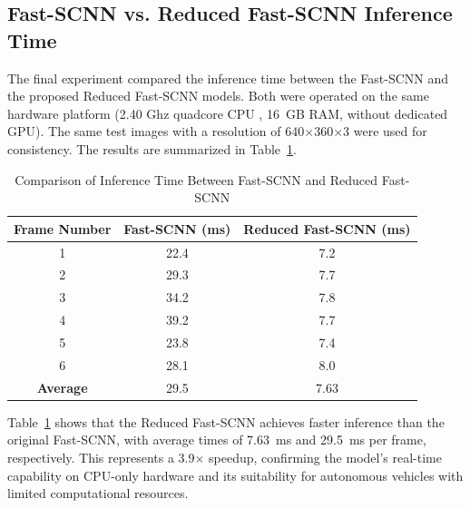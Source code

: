 \documentclass[conference, a4paper]{IEEEtran}[2015/08/26]
\begin{document}
\subsection{Fast-SCNN vs. Reduced Fast-SCNN Inference Time}
The final experiment compared the inference time between the Fast-SCNN and the proposed Reduced Fast-SCNN models. Both were operated on the same hardware platform (2.40 Ghz quadcore CPU , 16~GB RAM, without dedicated GPU). The same test images with a resolution of 640$\times$360$\times$3 were used for consistency. The results are summarized in Table~\ref{tab:lane_detection_inference_time}.

\begin{table}[H]
	\centering
	\caption{Comparison of Inference Time Between Fast-SCNN and Reduced Fast-SCNN}
	\label{tab:lane_detection_inference_time}
	\begin{tabular}{|c|c|c|}
		\hline
		\textbf{Frame Number} & \textbf{Fast-SCNN (ms)} & \textbf{Reduced Fast-SCNN (ms)} \\ \hline
		1 & 22.4 & 7.2 \\ \hline
		2 & 29.3 & 7.7 \\ \hline
		3 & 34.2 & 7.8 \\ \hline
		4 & 39.2 & 7.7 \\ \hline
		5 & 23.8 & 7.4 \\ \hline
		6 & 28.1 & 8.0 \\ \hline
		\textbf{Average} & 29.5 & 7.63 \\ \hline
	\end{tabular}
\end{table}


Table~\ref{tab:lane_detection_inference_time} shows that the Reduced Fast-SCNN achieves faster inference than the original Fast-SCNN, with average times of 7.63~ms and 29.5~ms per frame, respectively. This represents a 3.9$\times$ speedup, confirming the model’s real-time capability on CPU-only hardware and its suitability for autonomous vehicles with limited computational resources.
\end{document}
